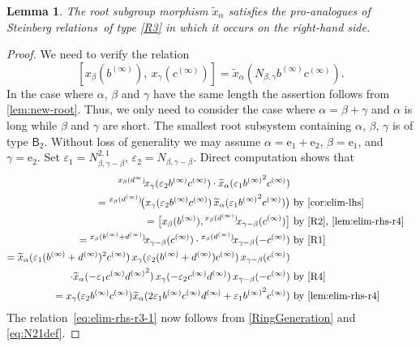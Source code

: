\documentclass[oneside, 11pt]{amsart}
\numberwithin{equation}{section}
\newtheorem{lemma}{Lemma} \numberwithin{lemma}{section}
\theoremstyle{definition}
\theoremstyle{remark}
\DeclareMathOperator\St{St}
\newcommand{\up}[2]{{^{#1}\!{#2}}}
\newcommand{\rB}{\mathsf{B}}
\begin{document}
\begin{lemma} \label{lem:elim-rhs-r3}
 The root subgroup morphism $\widetilde{x}_\alpha$ satisfies the pro-analogues of Steinberg relations~of type \eqref{R3} in which it occurs on the right-hand side. %
\end{lemma}
\begin{proof}
We need to verify the relation 
\begin{equation}\label{eq:elim-rhs-r3-1} [x_{\beta}(b^{(\infty)}),\ x_{\gamma}(c^{(\infty)})] = \widetilde{x}_{\alpha}(N_{\beta,\gamma} b^{(\infty)}c^{(\infty)}).\end{equation}
In the case where $\alpha$, $\beta$ and $\gamma$ have the same length the assertion follows from \cref{lem:new-root}. Thus, we only need to consider the case where \(\alpha = \beta + \gamma\) and \(\alpha\) is long while \(\beta\) and \(\gamma\) are short. The smallest root subsystem containing \(\alpha\), \(\beta\), \(\gamma\) is of type \(\rB_2\). Without loss of generality we may assume \(\alpha = \mathrm e_1 + \mathrm e_2\), \(\beta = \mathrm e_1\), and \(\gamma = \mathrm e_2\).
Set $\varepsilon_1 = N_{\beta,\gamma-\beta}^{2,1}$, $\varepsilon_2 = N_{\beta,\gamma-\beta}$. Direct computation shows that \begin{align*}
  \up{x_\beta(d^\infty)} x_\gamma(\varepsilon_2b^{(\infty)}c^{(\infty)}) \cdot \widetilde{x}_\alpha(\varepsilon_1 {b^{(\infty)}}^2{c^{(\infty)}}) \\
  = \up{x_\beta(d^{(\infty)})}
   {\bigl(x_\gamma(\varepsilon_2 b^{(\infty)} c^{(\infty)})\,
   \widetilde x_\alpha(\varepsilon_1
   {b^{(\infty)}}^2 c^{(\infty)})\bigr)} & \text{ by \cref{cor:elim-lhs}}\\
  = \bigl[x_\beta(b^{(\infty)}),
  \up{x_\beta(d^{(\infty)})}
   {x_{\gamma - \beta}(c^{(\infty)})}\bigr] & \text{ by~\eqref{R2}, \cref{lem:elim-rhs-r4}}\\
  = \up{x_\beta(b^{(\infty)} + d^{(\infty)})}
   {x_{\gamma - \beta}(c^{(\infty)})}\cdot
  \up{x_\beta(d^{(\infty)})}
   {x_{\gamma - \beta}(-c^{(\infty)})} & \text{ by~\eqref{R1}} \\  
  = \widetilde x_\alpha(\varepsilon_1 (b^{(\infty)} + d^{(\infty)})^2 c^{(\infty)})\, x_\gamma(\varepsilon_2 (b^{(\infty)} + d^{(\infty)}) c^{(\infty)})\, x_{\gamma - \beta}(c^{(\infty)})\\
  \cdot \widetilde x_\alpha(-\varepsilon_1 c^{(\infty)} {d^{(\infty)}}^2)\, x_\gamma(-\varepsilon_2 c^{(\infty)} d^{(\infty)})\, x_{\gamma - \beta}(-c^{(\infty)})& \text{ by~\eqref{R4}}\\
  = x_{\gamma}(\varepsilon_2 b^{(\infty)}c^{(\infty)}) \widetilde{x}_{\alpha}(2\varepsilon_1{b^{(\infty)}} c^{(\infty)} {d^{(\infty)}} + \varepsilon_1 {b^{(\infty)}}^2{c^{(\infty)}})& \text{ by~\cref{lem:elim-rhs-r4}}
 \end{align*}
The relation~\eqref{eq:elim-rhs-r3-1} now follows from \cref{RingGeneration} and \eqref{eq:N21def}.
\end{proof}
\end{document}
